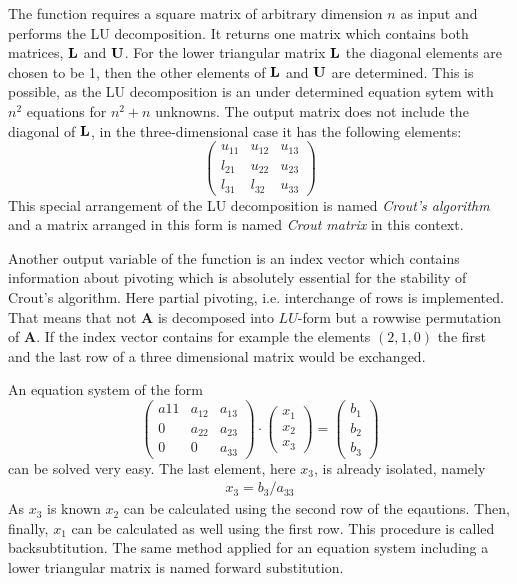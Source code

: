 The function  requires a square matrix of arbitrary
dimension $n$ as input and performs the LU decomposition. It returns one
matrix which contains both matrices, ${\bf L}$ and ${\bf U}$. 
For the lower triangular matrix  ${\bf L}$ the diagonal elements 
are chosen to be 1, then the other elements of ${\bf L}$ and ${\bf U}$
are determined. This is possible, as the LU decomposition is an under
determined equation sytem with $n^2$ equations for $n^2+n$ unknowns. 
The output matrix does not include the diagonal of ${\bf L}$, in the
three-dimensional case it has the following elements:
\[ \left(
  \begin{array}{ccc}
    u_{11} & u_{12} & u_{13} \\
    l_{21} & u_{22} & u_{23} \\
    l_{31} & l_{32} & u_{33}
    \end{array} \right)
\]
This special arrangement of the LU decomposition is named {\sl
Crout's algorithm} and a matrix arranged in this form is named {\sl
Crout matrix} in this context.
  

Another output variable of the function  is an index
vector which contains information about pivoting which is absolutely
essential for the stability of
Crout's algorithm. Here partial pivoting,
i.e. interchange of rows is implemented. That means that not {\bf A} is
decomposed into $LU$-form but a rowwise permutation of {\bf A}. If the
index vector contains for example the elements $(2,1,0)$ the first and
the last row of a three dimensional matrix would be exchanged.


\label{sec:lin_alg:backsub}
An equation system of the form
\[ 
\left(
  \begin{array}{ccc}
    a{11} & a_{12} & a_{13} \\
    0 & a_{22} & a_{23}\\
    0 & 0 & a_{33}
    \end{array} \right)
\cdot
\left(
  \begin{array}{c}
    x_1\\x_2\\x_3
 \end{array} \right)
=
\left(
  \begin{array}{c}
    b_1\\b_2\\b_3
 \end{array} \right)
\]
can be solved very easy. The last element, here $x_3$, is already isolated,
namely
\begin{eqnarray}
  x_3 = b_3/a_{33}
\end{eqnarray}
As $x_3$ is known $x_2$ can be calculated using the second row of the
eqautions. Then, finally, $x_1$ can be calculated as well using the
first row. This procedure
is called backsubtitution. The same
method  applied for an equation system including a
lower triangular matrix is named forward substitution.   

